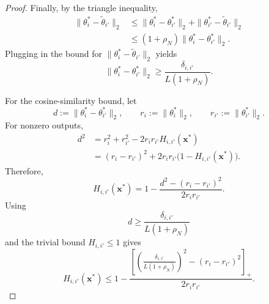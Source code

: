 \begin{proof}
Finally, by the triangle inequality,
\[
\begin{aligned}
    \|\theta_i^*-\widetilde\theta_{i'}\|_2
    &\le
    \|\theta_i^*-\theta_{i'}^*\|_2
    +
    \|\theta_{i'}^*-\widetilde\theta_{i'}\|_2 \\
    &\le
    (1+\rho_N)
    \|\theta_i^*-\theta_{i'}^*\|_2.
\end{aligned}
\]
Plugging in the bound for $\lVert \theta^*_i-\widetilde{\theta}_{i'} \rVert_2$ yields
\[
    \|\theta_i^*-\theta_{i'}^*\|_2
    \ge
    \frac{\delta_{i,i'}}
         {L(1+\rho_N)}.
\]

For the cosine-similarity bound, let
\[
    d:=\|\theta_i^*-\theta_{i'}^*\|_2,
    \qquad
    r_i:=\|\theta_i^*\|_2,
    \qquad
    r_{i'}:=\|\theta_{i'}^*\|_2.
\]
For nonzero outputs,
\[
\begin{aligned}
    d^2
    &=
    r_i^2+r_{i'}^2
    -
    2r_ir_{i'}H_{i,i'}(\mathbf x^*)\\
    &=
    (r_i-r_{i'})^2
    +
    2r_ir_{i'}
    \bigl(1-H_{i,i'}(\mathbf x^*)\bigr).
\end{aligned}
\]
Therefore,
\[
    H_{i,i'}(\mathbf x^*)
    =
    1-
    \frac{
        d^2-(r_i-r_{i'})^2
    }{
        2r_ir_{i'}
    }.
\]
Using
\[
    d
    \ge
    \frac{\delta_{i,i'}}
         {L(1+\rho_N)}
\]
and the trivial bound $H_{i,i'}\le1$ gives
\[
H_{i,i'}(\mathbf x^*)
\le
1-
\frac{
\left[
\left(
\frac{\delta_{i,i'}}{L(1+\rho_N)}
\right)^2
-(r_i-r_{i'})^2
\right]_+
}{
2r_ir_{i'}
}.
\]
\end{proof}

